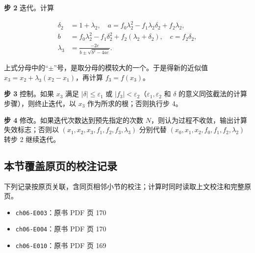 \documentclass[
  10pt,
  fontset=fandol]{ctexart}
\providecommand{\tightlist}{%
  \setlength{\itemsep}{0pt}\setlength{\parskip}{0pt}}
\begin{document}
\textbf{步 2} 迭代。计算

\[
\begin{aligned}
\delta_2&=1+\lambda_2,\quad a=f_0\lambda_2^2-f_1\lambda_2\delta_2+f_2\lambda_2,\\
b&=f_0\lambda_2^2-f_1\delta_2^2+f_2(\lambda_2+\delta_2),\quad c=f_2\delta_2,\\
\lambda_3&=\frac{-2c}{b\pm\sqrt{b^2-4ac}}.
\end{aligned}
\]

上式分母中的``\(\pm\)''号，是取分母的模较大的一个。于是得新的近似值 \(x_3=x_2+\lambda_3(x_2-x_1)\)，再计算 \(f_3=f(x_3)\)。

\textbf{步 3} 控制。如果 \(x_3\) 满足 \(|\delta|\leqslant\varepsilon_1\) 或 \(|f_3|<\varepsilon_2\)（\(\varepsilon_1,\varepsilon_2\) 和 \(\delta\) 的意义同弦截法的计算步骤），则终止迭代，以 \(x_3\) 作为所求的根；否则执行步 4。

\textbf{步 4} 修改。如果迭代次数达到预先指定的次数 \(N\)，则认为过程不收敛，输出计算失效标志；否则以 \((x_1,\allowbreak x_2,\allowbreak x_3,\allowbreak f_1,\allowbreak f_2,\allowbreak f_3,\allowbreak \lambda_3)\) 分别代替 \((x_0,\allowbreak x_1,\allowbreak x_2,\allowbreak f_0,\allowbreak f_1,\allowbreak f_2,\allowbreak \lambda_2)\) 转步 2 继续迭代。

\subsection{本节覆盖原页的校注记录}\label{ux672cux8282ux8986ux76d6ux539fux9875ux7684ux6821ux6ce8ux8bb0ux5f55}

下列记录按原页关联，含同页相邻小节的校注；计算时同时读取上文校注和完整原页。

\begin{itemize}
\tightlist
\item
  \texttt{ch06-E003}：原书 PDF 页 170
\item
  \texttt{ch06-E004}：原书 PDF 页 170
\item
  \texttt{ch06-E010}：原书 PDF 页 169
\end{itemize}
\end{document}
